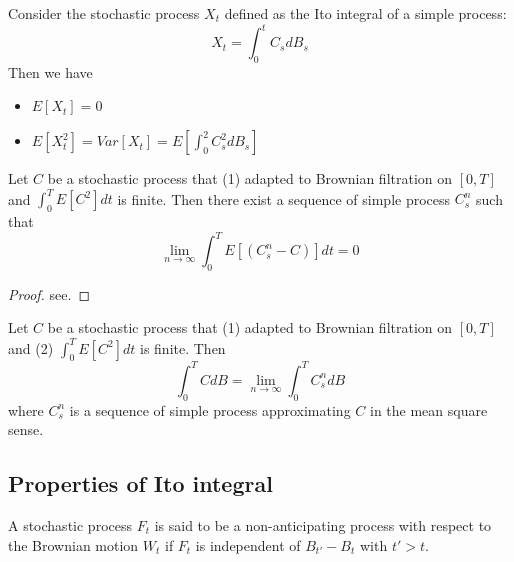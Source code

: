 \begin{refsection}
\begin{corollary}
	Consider the stochastic process $X_t$ defined as the Ito integral of a simple process:
	$$X_t = \int_0^t C_s dB_s$$
	Then we have
	\begin{itemize}
		\item $E[X_t] = 0$ 
		\item $E[X_t^2] = Var[X_t]= E[\int_0^2 C_s^2 dB_s]$
	\end{itemize}
\end{corollary}


\begin{theorem}
	Let $C$ be a stochastic process that (1) adapted to Brownian filtration on $[0,T]$ and $\int_0^T E[C^2]dt$ is finite. Then there exist a sequence of simple process $C_s^n$ such that
	$$\lim_{n\to \infty}\int_0^T E[(C_s^n - C)]dt = 0$$
\end{theorem}
\begin{proof}
	see\cite[109]{mikosch1998elementary}.
\end{proof}


\begin{definition}
	Let $C$ be a stochastic process that (1) adapted to Brownian filtration on $[0,T]$ and (2) $\int_0^T E[C^2]dt$ is finite. Then
	$$\int_0^T CdB = \lim_{n\to\infty} \int_0^T C_s^n dB$$
	where $C_s^n$ is a sequence of simple process approximating $C$ in the mean square sense.
\end{definition}


\subsection{Properties of Ito integral}
\begin{definition}
	A stochastic process $F_t$ is said to be a non-anticipating process with respect to the Brownian motion $W_t$ if $F_t$ is independent of $B_{t'}-B_t$ with $t' > t$.
\end{definition}


\end{refsection}
